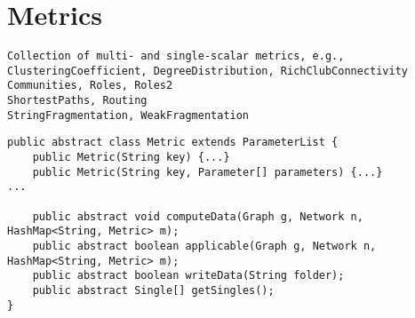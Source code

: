 
\section{Metrics}
\label{sec:metrics}





\begin{verbatim}
Collection of multi- and single-scalar metrics, e.g.,
ClusteringCoefficient, DegreeDistribution, RichClubConnectivity
Communities, Roles, Roles2
ShortestPaths, Routing
StringFragmentation, WeakFragmentation
\end{verbatim}



\begin{lstlisting}[label={lst:metrics:metric},caption={Basic methods of Metric}]
public abstract class Metric extends ParameterList {
	public Metric(String key) {...}
	public Metric(String key, Parameter[] parameters) {...}
...

	public abstract void computeData(Graph g, Network n, HashMap<String, Metric> m);
	public abstract boolean applicable(Graph g, Network n, HashMap<String, Metric> m);
	public abstract boolean writeData(String folder);
	public abstract Single[] getSingles();
}
\end{lstlisting}



